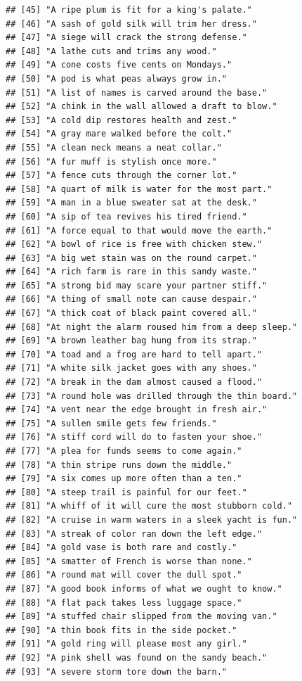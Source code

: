 \documentclass[
]{article}
\begin{document}
\begin{verbatim}
## [45] "A ripe plum is fit for a king's palate."         
## [46] "A sash of gold silk will trim her dress."        
## [47] "A siege will crack the strong defense."          
## [48] "A lathe cuts and trims any wood."                
## [49] "A cone costs five cents on Mondays."             
## [50] "A pod is what peas always grow in."              
## [51] "A list of names is carved around the base."      
## [52] "A chink in the wall allowed a draft to blow."    
## [53] "A cold dip restores health and zest."            
## [54] "A gray mare walked before the colt."             
## [55] "A clean neck means a neat collar."               
## [56] "A fur muff is stylish once more."                
## [57] "A fence cuts through the corner lot."            
## [58] "A quart of milk is water for the most part."     
## [59] "A man in a blue sweater sat at the desk."        
## [60] "A sip of tea revives his tired friend."          
## [61] "A force equal to that would move the earth."     
## [62] "A bowl of rice is free with chicken stew."       
## [63] "A big wet stain was on the round carpet."        
## [64] "A rich farm is rare in this sandy waste."        
## [65] "A strong bid may scare your partner stiff."      
## [66] "A thing of small note can cause despair."        
## [67] "A thick coat of black paint covered all."        
## [68] "At night the alarm roused him from a deep sleep."
## [69] "A brown leather bag hung from its strap."        
## [70] "A toad and a frog are hard to tell apart."       
## [71] "A white silk jacket goes with any shoes."        
## [72] "A break in the dam almost caused a flood."       
## [73] "A round hole was drilled through the thin board."
## [74] "A vent near the edge brought in fresh air."      
## [75] "A sullen smile gets few friends."                
## [76] "A stiff cord will do to fasten your shoe."       
## [77] "A plea for funds seems to come again."           
## [78] "A thin stripe runs down the middle."             
## [79] "A six comes up more often than a ten."           
## [80] "A steep trail is painful for our feet."          
## [81] "A whiff of it will cure the most stubborn cold." 
## [82] "A cruise in warm waters in a sleek yacht is fun."
## [83] "A streak of color ran down the left edge."       
## [84] "A gold vase is both rare and costly."            
## [85] "A smatter of French is worse than none."         
## [86] "A round mat will cover the dull spot."           
## [87] "A good book informs of what we ought to know."   
## [88] "A flat pack takes less luggage space."           
## [89] "A stuffed chair slipped from the moving van."    
## [90] "A thin book fits in the side pocket."            
## [91] "A gold ring will please most any girl."          
## [92] "A pink shell was found on the sandy beach."      
## [93] "A severe storm tore down the barn."
\end{verbatim}
\end{document}
